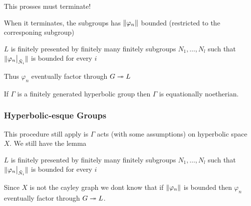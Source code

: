 \documentclass{beamer}[10]
\begin{document}
\begin{frame}
    \begin{block}{}
        This prosses must terminate!
        
        When it terminates, the subgroups has $\lVert \varphi_n \rVert$ bounded (restricted to the corresponing subgroup)
    \end{block}

    \begin{corollary}
        $L$ is finitely presented by finitely many finitely subgroups $N_1, \ldots, N_l$ such that $\lVert \varphi_{n}\big\vert_{\tilde{N}_i} \rVert$ is bounded for every $i$

        Thus $\varphi_n$ eventually factor through $G \twoheadrightarrow L$
    \end{corollary}

    \begin{Theorem}
        If $\Gamma$ is a finitely generated hyperbolic group then $\Gamma$ is equationally noetherian.
    \end{Theorem}

\end{frame}

\begin{frame}
    \frametitle<overlay specification>[short title]{Hyperbolic-esque Groups}
    This procedure still apply is $\Gamma$ acts (with some assumptions) on hyperbolic space $X$. We still have the lemma
    \begin{lemma}
        $L$ is finitely presented by finitely many finitely subgroups $N_1, \ldots, N_l$ such that $\lVert \varphi_{n}\big\vert_{\tilde{N}_i} \rVert$ is bounded for every $i$
    \end{lemma}

    Since $X$ is not the cayley graph we dont know that if $\lVert \varphi_n \rVert$ is bounded then $\varphi_n$ eventually factor through $G\twoheadrightarrow L$.
\end{frame}
\end{document}
